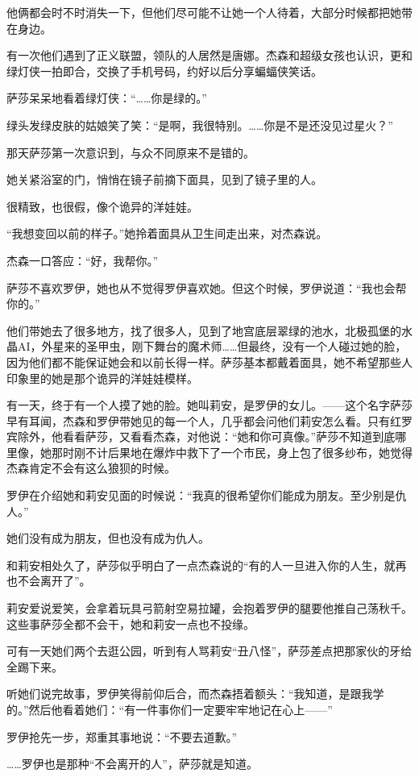 \documentclass[../main]{subfiles}
\begin{document}
他俩都会时不时消失一下，但他们尽可能不让她一个人待着，大部分时候都把她带在身边。

有一次他们遇到了正义联盟，领队的人居然是唐娜。杰森和超级女孩也认识，更和绿灯侠一拍即合，交换了手机号码，约好以后分享蝙蝠侠笑话。

萨莎呆呆地看着绿灯侠：“……你是绿的。”

绿头发绿皮肤的姑娘笑了笑：“是啊，我很特别。……你是不是还没见过星火？”

那天萨莎第一次意识到，与众不同原来不是错的。

她关紧浴室的门，悄悄在镜子前摘下面具，见到了镜子里的人。

很精致，也很假，像个诡异的洋娃娃。

“我想变回以前的样子。”她拎着面具从卫生间走出来，对杰森说。

杰森一口答应：“好，我帮你。”

萨莎不喜欢罗伊，她也从不觉得罗伊喜欢她。但这个时候，罗伊说道：“我也会帮你的。”

他们带她去了很多地方，找了很多人，见到了地宫底层翠绿的池水，北极孤堡的水晶AI，外星来的圣甲虫，刚下舞台的魔术师……但最终，没有一个人碰过她的脸，因为他们都不能保证她会和以前长得一样。萨莎基本都戴着面具，她不希望那些人印象里的她是那个诡异的洋娃娃模样。

有一天，终于有一个人摸了她的脸。她叫莉安，是罗伊的女儿。——这个名字萨莎早有耳闻，杰森和罗伊带她见的每一个人，几乎都会问他们莉安怎么看。只有红罗宾除外，他看看萨莎，又看看杰森，对他说：“她和你可真像。”萨莎不知道到底哪里像，她那时刚不计后果地在爆炸中救下了一个市民，身上包了很多纱布，她觉得杰森肯定不会有这么狼狈的时候。

罗伊在介绍她和莉安见面的时候说：“我真的很希望你们能成为朋友。至少别是仇人。”

她们没有成为朋友，但也没有成为仇人。

和莉安相处久了，萨莎似乎明白了一点杰森说的“有的人一旦进入你的人生，就再也不会离开了”。

莉安爱说爱笑，会拿着玩具弓箭射空易拉罐，会抱着罗伊的腿要他推自己荡秋千。这些事萨莎全都不会干，她和莉安一点也不投缘。

可有一天她们两个去逛公园，听到有人骂莉安“丑八怪”，萨莎差点把那家伙的牙给全踢下来。

听她们说完故事，罗伊笑得前仰后合，而杰森捂着额头：“我知道，是跟我学的。”然后他看着她们：“有一件事你们一定要牢牢地记在心上——”

罗伊抢先一步，郑重其事地说：“不要去道歉。”

……罗伊也是那种“不会离开的人”，萨莎就是知道。
\end{document}
